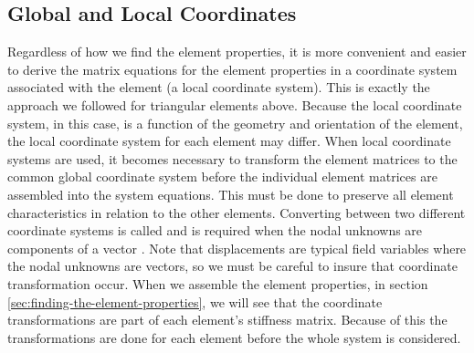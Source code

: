 \subsection{Global and Local Coordinates}
Regardless of how we find the element properties, it is more
convenient and easier to derive the matrix equations for the element
properties in a coordinate system associated with the element (a local
coordinate system). This is exactly the approach we followed for
triangular elements above. Because the local coordinate system, in this
case, is a function of the geometry and orientation of the element,
the local coordinate system for each element may differ.
%
When local coordinate systems are used, it becomes necessary to
transform the element matrices to the common global coordinate system
before the individual element matrices are assembled into the system
equations. This must be done to preserve all element characteristics
in relation to the other elements. Converting between two different
coordinate systems is called  and 
is required when the nodal unknowns are components of a vector
.
Note that displacements are typical field variables where the nodal
unknowns are vectors, so we must be careful to insure that
coordinate transformation occur. When we assemble the element
properties, in section \vref{sec:finding-the-element-properties}, we
will see that the coordinate transformations are part of each
element's stiffness matrix. Because of this the transformations are done
for each element before the whole system is considered.


